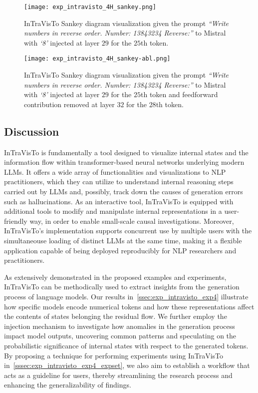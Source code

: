 \begin{figure}[t!]
    \centering
    \texttt{[image: exp\_intravisto\_4H\_sankey.png]}
    \caption[InTraVisTo Sankey diagram visualization given the prompt \emph{``Write numbers in reverse order. Number: 13843234 Reverse:''} to Mistral with injection.]{InTraVisTo Sankey diagram visualization given the prompt \emph{``Write numbers in reverse order. Number: 13843234 Reverse:''} to Mistral with \emph{`8'} injected at layer $29$ for the $25$th token.}
    \label{fig:exp_intravisto_4_H1}
\end{figure}
\begin{figure}[t!]
    \centering
    \texttt{[image: exp\_intravisto\_4H\_sankey-abl.png]}
    \caption[InTraVisTo Sankey diagram visualization given the prompt \emph{``Write numbers in reverse order. Number: 13843234 Reverse:''} to Mistral with injection and ablation.]{InTraVisTo Sankey diagram visualization given the prompt \emph{``Write numbers in reverse order. Number: 13843234 Reverse:''} to Mistral with \emph{`8'} injected at layer $29$ for the $25$th token and feedforward contribution removed at layer $32$ for the $28$th token.}
    \label{fig:exp_intravisto_4_H2}
\end{figure}

\subsection{Discussion}

InTraVisTo is fundamentally a tool designed to visualize internal states and the information flow within transformer-based neural networks underlying modern LLMs.
It offers a wide array of functionalities and visualizations to NLP practitioners, which they can utilize to understand internal reasoning steps carried out by LLMs and, possibly, track down the causes of generation errors such as hallucinations.
As an interactive tool, InTraVisTo is equipped with additional tools to modify and manipulate internal representations in a user-friendly way, in order to enable small-scale causal investigations.
Moreover, InTraVisTo's implementation supports concurrent use by multiple users with the simultaneouse loading of distinct LLMs at the same time, making it a flexible application capable of being deployed reproducibly for NLP researchers and practitioners.

As extensively demonstrated in the proposed examples and experiments, InTraVisTo can be methodically used  to extract insights from the generation process of language models.
Our results in~\cref{ssec:exp_intravisto_exp4} illustrate how specific models encode numerical tokens and how these representations affect the contents of states belonging the residual flow.
We further employ the injection mechanism to investigate how anomalies in the generation process impact model outputs, uncovering common patterns and speculating on the probabilistic significance of internal states with respect to the generated tokens.
By proposing a technique for performing experiments using InTraVisTo in~\cref{sssec:exp_intravisto_exp4_expset}, we also aim to establish a workflow that acts as a guideline for users, thereby streamlining the research process and enhancing the generalizability of findings.

